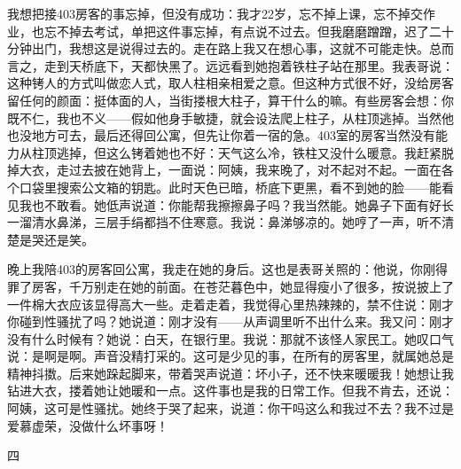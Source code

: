 我想把接403房客的事忘掉，但没有成功：我才22岁，忘不掉上课，忘不掉交作业，也忘不掉去考试，单把这件事忘掉，有点说不过去。但我磨磨蹭蹭，迟了二十分钟出门，我想这是说得过去的。走在路上我又在想心事，这就不可能走快。总而言之，走到天桥底下，天都快黑了。远远看到她抱着铁柱子站在那里。我表哥说：这种铐人的方式叫做恋人式，取人柱相亲相爱之意。但这种方式很不好，没给房客留任何的颜面：挺体面的人，当街搂根大柱子，算干什么的嘛。有些房客会想：你既不仁，我也不义——假如他身手敏捷，就会设法爬上柱子，从柱顶逃掉。当然他也没地方可去，最后还得回公寓，但先让你着一宿的急。403室的房客当然没有能力从柱顶逃掉，但这么铐着她也不好：天气这么冷，铁柱又没什么暖意。我赶紧脱掉大衣，走过去披在她背上，一面说：阿姨，我来晚了，对不起对不起。一面在各个口袋里搜索公文箱的钥匙。此时天色已暗，桥底下更黑，看不到她的脸——能看见我也不敢看。她低声说道：你能帮我擦擦鼻子吗？我当然能。她鼻子下面有好长一溜清水鼻涕，三层手绢都挡不住寒意。我说：鼻涕够凉的。她哼了一声，听不清楚是哭还是笑。 

晚上我陪403的房客回公寓，我走在她的身后。这也是表哥关照的：他说，你刚得罪了房客，千万别走在她的前面。在苍茫暮色中，她显得瘦小了很多，按说披上了一件棉大衣应该显得高大一些。走着走着，我觉得心里热辣辣的，禁不住说：刚才你碰到性骚扰了吗？她说道：刚才没有——从声调里听不出什么来。我又问：刚才没有什么时候有？她说：白天，在银行里。我说：那就不该怪人家民工。她叹口气说：是啊是啊。声音没精打采的。这可是少见的事，在所有的房客里，就属她总是精神抖擞。后来她跺起脚来，带着哭声说道：坏小子，还不快来暖暖我！她想让我钻进大衣，搂着她让她暖和一点。这件事也是我的日常工作。但我不肯去，还说：阿姨，这可是性骚扰。她终于哭了起来，说道：你干吗这么和我过不去？我不过是爱慕虚荣，没做什么坏事呀！ 



四 

